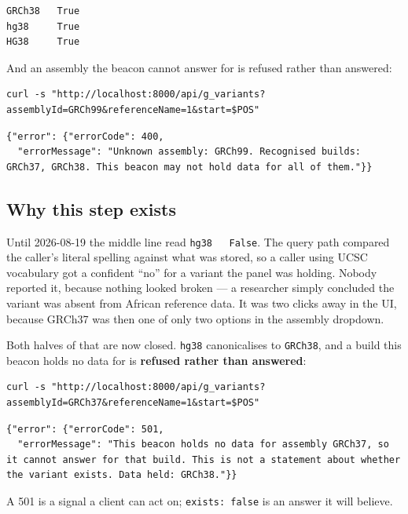 \documentclass[
  10pt,
]{article}
\begin{document}
\begin{verbatim}
GRCh38   True
hg38     True
HG38     True
\end{verbatim}

And an assembly the beacon cannot answer for is refused rather than
answered:

\begin{verbatim}
curl -s "http://localhost:8000/api/g_variants?assemblyId=GRCh99&referenceName=1&start=$POS"
\end{verbatim}

\begin{verbatim}
{"error": {"errorCode": 400,
  "errorMessage": "Unknown assembly: GRCh99. Recognised builds: GRCh37, GRCh38. This beacon may not hold data for all of them."}}
\end{verbatim}

\subsection{Why this step exists}\label{why-this-step-exists}

Until 2026-08-19 the middle line read \texttt{hg38\ \ \ False}. The
query path compared the caller's literal spelling against what was
stored, so a caller using UCSC vocabulary got a confident ``no'' for a
variant the panel was holding. Nobody reported it, because nothing
looked broken --- a researcher simply concluded the variant was absent
from African reference data. It was two clicks away in the UI, because
GRCh37 was then one of only two options in the assembly dropdown.

Both halves of that are now closed. \texttt{hg38} canonicalises to
\texttt{GRCh38}, and a build this beacon holds no data for is
\textbf{refused rather than answered}:

\begin{verbatim}
curl -s "http://localhost:8000/api/g_variants?assemblyId=GRCh37&referenceName=1&start=$POS"
\end{verbatim}

\begin{verbatim}
{"error": {"errorCode": 501,
  "errorMessage": "This beacon holds no data for assembly GRCh37, so it cannot answer for that build. This is not a statement about whether the variant exists. Data held: GRCh38."}}
\end{verbatim}

A 501 is a signal a client can act on; \texttt{exists:\ false} is an
answer it will believe.
\end{document}
